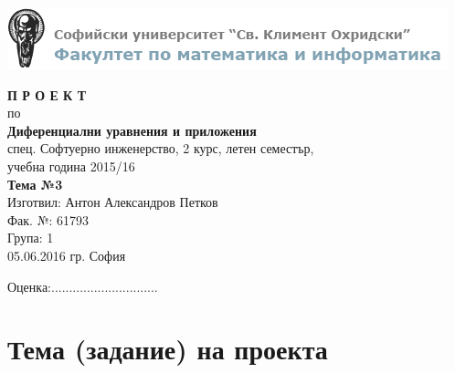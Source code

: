 \documentclass[14pt]{extarticle}
\begin{document}
  
\begin{center}

\includegraphics{fmi}

\vspace{1cm}

{\large \textbf{П Р О Е К Т}}\\
по\\
\textbf{Диференциални уравнения и приложения}\\
спец. Софтуерно инженерство, 2 курс, летен семестър,\\
учебна година 2015/16\\
\textbf{Тема №3}\\

\vspace{2cm}
Изготвил: Антон Александров Петков\\
Фак. №: 61793\\
Група: 1\\

\vspace{1cm}
05.06.2016 гр. София

\end{center}


\vfill\hfill
Оценка:..............................

\newpage
 
\tableofcontents

\section{Тема (задание) на проекта}
\end{document}
